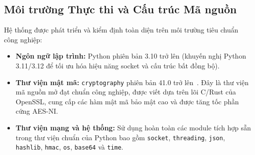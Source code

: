 \documentclass[a4paper,12pt]{article}
\begin{document}
\subsection{Môi trường Thực thi và Cấu trúc Mã nguồn}
Hệ thống được phát triển và kiểm định toàn diện trên môi trường tiêu chuẩn công nghiệp:
\begin{itemize}
    \item \textbf{Ngôn ngữ lập trình:} Python phiên bản 3.10 trở lên (khuyến nghị Python 3.11/3.12 để tối ưu hóa hiệu năng socket và cấu trúc bất đồng bộ).
    \item \textbf{Thư viện mật mã:} \texttt{cryptography} phiên bản 41.0 trở lên~\cite{pyca}. Đây là thư viện mã nguồn mở đạt chuẩn công nghiệp, được viết dựa trên lõi C/Rust của OpenSSL, cung cấp các hàm mật mã bảo mật cao và được tăng tốc phần cứng AES-NI.
    \item \textbf{Thư viện mạng và hệ thống:} Sử dụng hoàn toàn các module tích hợp sẵn trong thư viện chuẩn của Python bao gồm \texttt{socket}, \texttt{threading}, \texttt{json}, \texttt{hashlib}, \texttt{hmac}, \texttt{os}, \texttt{base64} và \texttt{time}.
\end{itemize}
\end{document}
